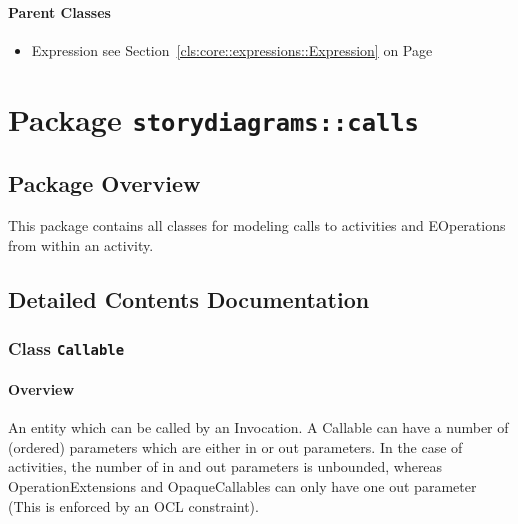 \paragraph{Parent Classes}
\begin{itemize}
\item Expression see Section~\ref{cls:core::expressions::Expression} on Page~\pageref{cls:core::expressions::Expression}\end{itemize}
\newpage
		


\section{Package \bfseries \texttt{storydiagrams::calls}\normalfont}
\subsection{Package Overview}
	
			
This package contains all classes for modeling calls to activities and EOperations
from within an activity.	
		
	
			
		



\subsection{Detailed Contents Documentation}
\subsubsection{\Large{Class \bfseries \texttt{Callable}\normalfont}}
\label{cls:storydiagrams::calls::Callable} 
\paragraph{Overview}

	
			
An entity which can be called by an Invocation. A Callable can have a number of (ordered) parameters which are either in or out parameters. In the case of activities, the number of in and out parameters is unbounded, whereas OperationExtensions and OpaqueCallables can only have one out parameter (This is enforced by an OCL constraint).	
		
	



